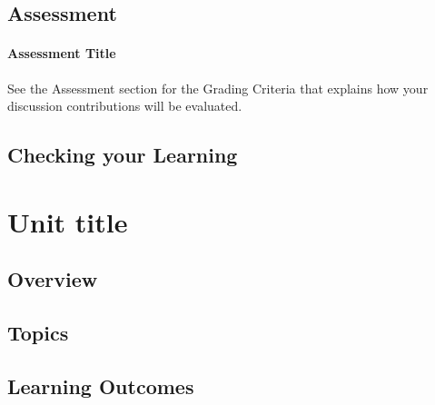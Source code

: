 \documentclass[
]{book}
\begin{document}
\hypertarget{assessment-7}{%
\section*{Assessment}\label{assessment-7}}

\begin{assessment}
\hypertarget{assessment-title}{%
\subsubsection*{Assessment Title}\label{assessment-title}}

See the Assessment section for the Grading Criteria that explains how
your discussion contributions will be evaluated.
\end{assessment}

\hypertarget{checking-your-learning-7}{%
\section*{Checking your Learning}\label{checking-your-learning-7}}

\begin{progress}

\end{progress}

\hypertarget{unit-title-8}{%
\chapter{Unit title}\label{unit-title-8}}

\hypertarget{overview-8}{%
\section*{Overview}\label{overview-8}}

\hypertarget{topics-8}{%
\section*{Topics}\label{topics-8}}

\hypertarget{learning-outcomes-8}{%
\section*{Learning Outcomes}\label{learning-outcomes-8}}
\end{document}
